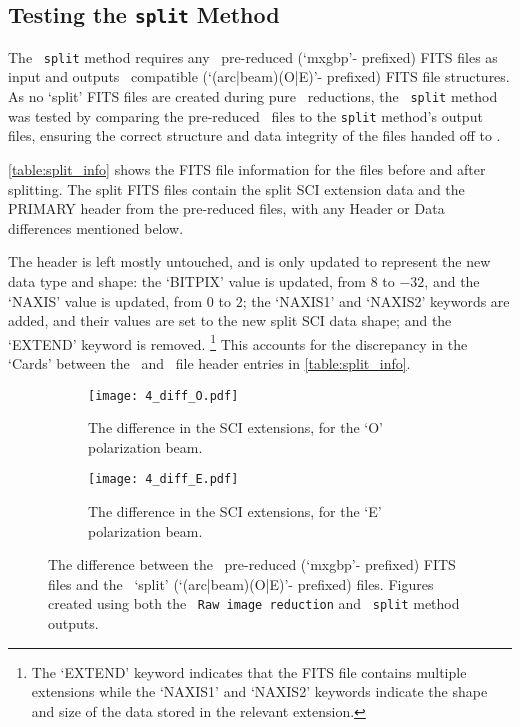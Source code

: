 \subsection{Testing the \texttt{split} Method} \label{subsec:test_split}

The \stops\ \texttt{split} method requires any \polsalt\ pre-reduced (`mxgbp'- prefixed) \gls{FITS} files as input and outputs \iraf\ compatible (`(arc|beam)(O|E)'- prefixed) \gls{FITS} file structures. As no `split' \gls{FITS} files are created during pure \polsalt\ reductions, the \stops\ \texttt{split} method was tested by comparing the pre-reduced \polsalt\ files to the \texttt{split} method's output files, ensuring the correct structure and data integrity of the files handed off to \iraf.



\autoref{table:split_info} shows the \gls{FITS} file information for the files before and after splitting. The split \gls{FITS} files contain the split \gls{SCI} extension data and the \gls{PRIMARY} header from the pre-reduced files, with any Header or Data differences mentioned below.

The header is left mostly untouched, and is only updated to represent the new data type and shape:
the `BITPIX' value is updated, from $8$ to $-32$, and the `NAXIS' value is updated, from $0$ to $2$;
the `NAXIS1' and `NAXIS2' keywords are added, and their values are set to the new split \gls{SCI} data shape;
and the `EXTEND' keyword is removed.%
\footnote{The `EXTEND' keyword indicates that the \gls{FITS} file contains multiple extensions while the `NAXIS1' and `NAXIS2' keywords indicate the shape and size of the data stored in the relevant extension.}
This accounts for the discrepancy in the `Cards' between the \polsalt\ and \stops\ file header entries in \autoref{table:split_info}.

\begin{figure}
    \centering
    \begin{subfigure}[b]{\textwidth}
        \centering
        \texttt{[image: 4\_diff\_O.pdf]}
        \caption{The difference in the \gls{SCI} extensions, for the `O' polarization beam.}
        \label{subfig:diff_split_O}
    \end{subfigure}
    \hfill
    \begin{subfigure}[b]{\textwidth}
        \centering
        \texttt{[image: 4\_diff\_E.pdf]}
        \caption{The difference in the \gls{SCI} extensions, for the `E' polarization beam.}
        \label{subfig:diff_split_E}
    \end{subfigure}
    \caption{The difference between the \polsalt\ pre-reduced (`mxgbp'- prefixed) \gls{FITS} files and the \stops\ `split' (`(arc|beam)(O|E)'- prefixed) files. Figures created using both the \polsalt\ \texttt{Raw image reduction} and \stops\ \texttt{split} method outputs.}
    \label{fig:split_diff}
\end{figure}

